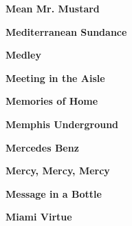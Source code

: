 \vspace{10pt} 
\begin{center}\textbf{Mean Mr. Mustard}\end{center}
\newline
\vspace{10pt} 
\begin{center}\textbf{Mediterranean Sundance}\end{center}
\newline
\vspace{10pt} 
\begin{center}\textbf{Medley}\end{center}
\newline
\vspace{10pt} 
\begin{center}\textbf{Meeting in the Aisle}\end{center}
\newline
\vspace{10pt} 
\begin{center}\textbf{Memories of Home}\end{center}
\newline
\vspace{10pt} 
\begin{center}\textbf{Memphis Underground}\end{center}
\newline
\vspace{10pt} 
\begin{center}\textbf{Mercedes Benz}\end{center}
\newline
\vspace{10pt} 
\begin{center}\textbf{Mercy, Mercy, Mercy}\end{center}
\newline
\vspace{10pt} 
\begin{center}\textbf{Message in a Bottle}\end{center}
\newline
\vspace{10pt} 
\begin{center}\textbf{Miami Virtue}\end{center}
